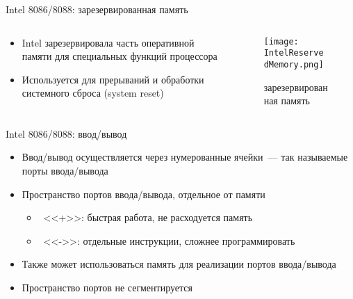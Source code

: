 \documentclass[aspectratio=169,14pt]{beamer}
\begin{document}
\begin{frame}{Intel 8086/8088: зарезервированная память}
    \begin{columns}[t,onlytextwidth]
        \begin{column}{0.6\textwidth}
            \begin{itemize}
                \item Intel зарезервировала часть оперативной памяти для
                специальных функций процессора
                \item Используется для прерываний и обработки системного
                сброса (system reset)
            \end{itemize}
        \end{column}
        \begin{column}{0.4\textwidth}
            \begin{figure}[t]
                \centering
                \texttt{[image: IntelReservedMemory.png]}
                \captionsetup{skip=-5pt}
                \caption{\tiny{зарезервированная память}}
            \end{figure}
        \end{column}
    \end{columns}
\end{frame}

\begin{frame}{Intel 8086/8088: ввод/вывод}
    \begin{itemize}
        \item Ввод/вывод осуществляется через нумерованные ячейки~---
        так называемые порты ввода/вывода
        \item Пространство портов ввода/вывода, отдельное от памяти
        \begin{itemize}
            \item ~<<+>>: быстрая работа, не расходуется память
            \item ~<<->>: отдельные инструкции, сложнее программировать
        \end{itemize}
        \item Также может использоваться память для реализации
         портов ввода/вывода
        \item Пространство портов не сегментируется
    \end{itemize}
\end{frame}
\end{document}
